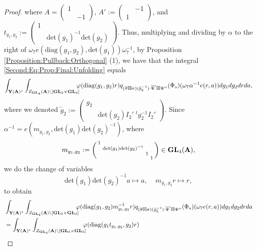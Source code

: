 \documentclass[11pt, reqno]{amsart}
\theoremstyle{plain}
\theoremstyle{definition}
\theoremstyle{remark}
\theoremstyle{plain}
\def\A{{\bf A}}
\def\GL{\mathbf{GL}}
\begin{document}
\begin{proof}
    where $A= \left(\begin{smallmatrix}1& \\ &-1\end{smallmatrix}\right)$, $ A':= \left(\begin{smallmatrix} & -1\\1& \end{smallmatrix}\right)$, and  $t_{g_1,g_2} := \left(\begin{smallmatrix}1 & \\ &\mathrm{det}(g_1)^{-1}\mathrm{det}(g_2)\end{smallmatrix}\right)$. Thus, multiplying and dividing by $\alpha$ to the right of $\omega_7e(\mathrm{diag}(g_1,g_2),\mathrm{det}(g_1))\omega_7^{-1}$, by Proposition \ref{Proposition:Pullback:Orthogonal} (1), we have that the integral \eqref{Second:Eq:Prop:Final:Unfolding} equals
        \begin{align*}
     \int_{ \mathbf{Y}(\A)^\circ } \int_{Z_{\GL_4}(\A)\backslash [\GL_2\times \GL_2]} \!\!\!\!\varphi({\rm diag}(g_1,g_2)r) 
       q_{(\overline{\sigma} \boxtimes \sigma)(\tilde{g}_2^{-1}) \cdot \overline{\Psi}'\boxtimes\Psi''}(\Phi_{s})(\omega_7 \alpha^{-1}e(r,a))dg_1dg_2drda,
       \end{align*}
       where we denoted $\tilde{g}_2 := \left(\begin{smallmatrix}g_2& \\ &\mathrm{det}(g_2)I_2'\;^tg_2^{-1}I_2'\end{smallmatrix}\right)$. Since $\alpha^{-1} = e\left(m_{g_1,g_2}, \mathrm{det}(g_1)\mathrm{det}(g_2)^{-1}\right)$, where $$m_{g_1,g_2} := \left(\begin{smallmatrix}1 & & & \\ &\mathrm{det}(g_1)\mathrm{det}(g_2)^{-1}& & \\ & &1 & \\ & & &1\end{smallmatrix}\right)\in \GL_4(\A),$$  we do the change of variables \[\mathrm{det}(g_1)\mathrm{det}(g_2)^{-1}a\mapsto a,\;\;\;\;m_{g_1,g_2}r\mapsto r,\]
       to obtain
       \begin{align*}
       &\int_{ \mathbf{Y}(\A)^\circ } \int_{Z_{\GL_4}(\A)\backslash [\GL_2\times \GL_2]} \!\!\!\!\varphi({\rm diag}(g_1 ,g_2) m_{g_1,g_2}^{-1} r) 
       q_{(\overline{\sigma} \boxtimes \sigma)(\tilde{g}_2^{-1}) \cdot \overline{\Psi}'\boxtimes\Psi''}(\Phi_{s})(\omega_7 e(r,a))dg_1dg_2drda \\ 
        &=\int_{ \mathbf{Y}(\A)^\circ } \int_{Z_{\GL_4}(\A)\backslash [\GL_2\times \GL_2]} \!\!\!\!\varphi({\rm diag}(g_1 t_{g_1,g_2},g_2) r) 

\end{align*}
\end{proof}
\end{document}
